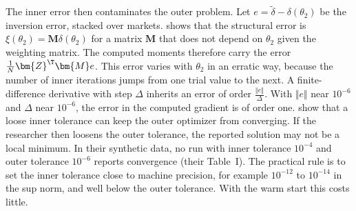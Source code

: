 The inner error then contaminates the outer problem. Let $e = \tilde\delta - \delta(\theta_2)$ be the
inversion error, stacked over markets.  shows that the structural error is $\xi(\theta_2) =
\bm{M}\delta(\theta_2)$ for a matrix $\bm{M}$ that does not depend on $\theta_2$ given the weighting matrix.
The computed moments therefore carry the error $\frac{1}{N}\bm{Z}^\T \bm{M} e$. This error varies with
$\theta_2$ in an erratic way, because the number of inner iterations jumps from one trial value to the next.
A finite-difference derivative with step $\Delta$ inherits an error of order $\frac{\Vert e\Vert}{\Delta}$.
With $\Vert e\Vert$ near $10^{-6}$ and $\Delta$ near $10^{-6}$, the error in the computed gradient is of
order one. \citet[Sections~4.2 and~6]{DubeFoxSu2012} show that a loose inner tolerance can keep the outer
optimizer from converging. If the researcher then loosens the outer tolerance, the reported solution may not be a
local minimum. In their synthetic data, no run with inner tolerance $10^{-4}$ and outer tolerance $10^{-6}$
reports convergence (their Table~I). The practical rule is to set the inner
tolerance close to machine precision, for example $10^{-12}$ to $10^{-14}$ in the sup norm, and well below the
outer tolerance. With the warm start this costs little.

